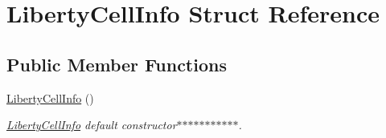 \hypertarget{structLibertyCellInfo}{\section{Liberty\-Cell\-Info Struct Reference}
\label{structLibertyCellInfo}
}
\subsection*{Public Member Functions}
\begin{DoxyCompactItemize}
\item 
\hyperlink{structLibertyCellInfo_a3250ab70b0c778ef0881b949c008814b}{Liberty\-Cell\-Info} ()
\begin{DoxyCompactList}\small\item\em \hyperlink{structLibertyCellInfo}{Liberty\-Cell\-Info} default constructor$\ast$$\ast$$\ast$$\ast$$\ast$$\ast$$\ast$$\ast$$\ast$$\ast$$\ast$. \end{DoxyCompactList}\end{DoxyCompactItemize}
